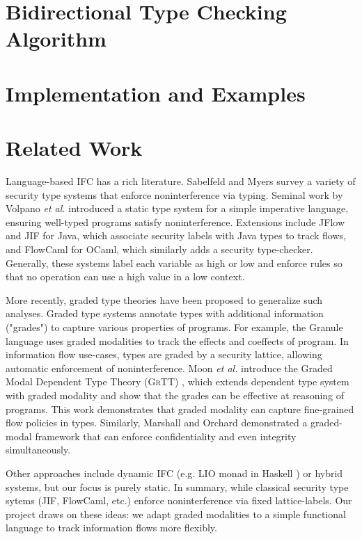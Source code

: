\documentclass[conference]{IEEEtran}
\begin{document}
\section{Bidirectional Type Checking Algorithm}

\section{Implementation and Examples}

\section{Related Work}

Language-based IFC has a rich literature. Sabelfeld and Myers \cite{sabelfeld2003language} survey a variety of security type systems that enforce noninterference via typing. Seminal work by Volpano \emph{et al.} \cite{volpano1996sound} introduced a static type system for a simple imperative language, ensuring well-typed programs satisfy noninterference. Extensions include JFlow \cite{myers1999jflow} and JIF \cite{pullicino2014jif} for Java, which associate security labels with Java types to track flows, and FlowCaml \cite{simonet2003flow} for OCaml, which similarly adds a security type-checker. Generally, these systems label each variable as high or low and enforce rules so that no operation can use a high value in a low context.

More recently, graded type theories have been proposed to generalize such analyses. Graded type systems annotate types with additional information ("grades") to capture various properties of programs. For example, the Granule language \cite{orchard2019quantitative} uses graded modalities to track the effects and coeffects of program. In information flow use-cases, types are graded by a security lattice, allowing automatic enforcement of noninterference. Moon \emph{et al.} introduce the Graded Modal Dependent Type Theory (\textsc{GrTT}) \cite{moon2021graded}, which extends dependent type system with graded modality and show that the grades can be effective at reasoning of programs. This work demonstrates that graded modality can capture fine-grained flow policies in types. Similarly, Marshall and Orchard  demonstrated a graded-modal framework that can enforce confidentiality and even integrity simultaneously.

Other approaches include dynamic IFC (e.g. LIO monad in Haskell \cite{stefan2011flexible}) or hybrid systems, but our focus is purely static. In summary, while classical security type sytems (JIF, FlowCaml, etc.) enforce noninterference via fixed lattice-labels. Our project draws on these ideas: we adapt graded modalities to a simple functional language to track information flows more flexibly.
\end{document}
